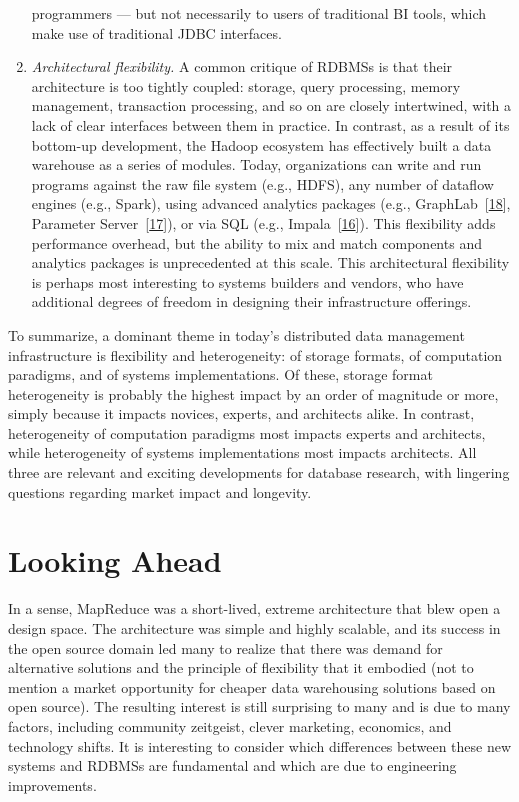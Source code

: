 \documentclass[b5paper,11pt,twoside,openright]{book}
\newcommand\Section[2]{
  \hypertarget{#1}{
    \section{#2}\label{#1}
  }
}
\begin{document}
\begin{enumerate}[label=\arabic*.)]
programmers --- but not necessarily to users of traditional BI tools,
which make use of traditional JDBC interfaces.
\item
\emph{Architectural flexibility.} A common critique of RDBMSs is
that their architecture is too tightly coupled: storage, query
processing, memory management, transaction processing, and so on are
closely intertwined, with a lack of clear interfaces between them in
practice. In contrast, as a result of its bottom-up development, the
Hadoop ecosystem has effectively built a data warehouse as a series of
modules. Today, organizations can write and run programs against the raw
file system (e.g., HDFS), any number of dataflow engines (e.g., Spark),
using advanced analytics packages (e.g.,
GraphLab~{{[}\protect\hyperlink{ref-graphlab}{18}{]}}, Parameter
Server~{{[}\protect\hyperlink{ref-parameterserver}{17}{]}}), or via SQL
(e.g., Impala~{{[}\protect\hyperlink{ref-impala}{16}{]}}). This
flexibility adds performance overhead, but the ability to mix and match
components and analytics packages is unprecedented at this scale. This
architectural flexibility is perhaps most interesting to systems
builders and vendors, who have additional degrees of freedom in
designing their infrastructure offerings.
\end{enumerate}

To summarize, a dominant theme in today's distributed data management
infrastructure is flexibility and heterogeneity: of storage formats, of
computation paradigms, and of systems implementations. Of these, storage
format heterogeneity is probably the highest impact by an order of
magnitude or more, simply because it impacts novices, experts, and
architects alike. In contrast, heterogeneity of computation paradigms
most impacts experts and architects, while heterogeneity of systems
implementations most impacts architects. All three are relevant and
exciting developments for database research, with lingering questions
regarding market impact and longevity.

\Section{looking-ahead}{%
Looking Ahead
}

In a sense, MapReduce was a short-lived, extreme architecture that blew
open a design space. The architecture was simple and highly scalable,
and its success in the open source domain led many to realize that there
was demand for alternative solutions and the principle of flexibility
that it embodied (not to mention a market opportunity for cheaper data
warehousing solutions based on open source). The resulting interest is
still surprising to many and is due to many factors, including community
zeitgeist, clever marketing, economics, and technology shifts. It is
interesting to consider which differences between these new systems and
RDBMSs are fundamental and which are due to engineering improvements.
\end{document}
